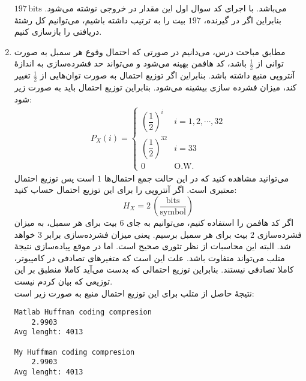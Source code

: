 \documentclass[a4paper]{article}
\begin{document}
\begin{enumerate}[1)]
$197 \, \mathrm{bits}$
می‌باشد. با اجرای کد سوال اول این مقدار در خروجی نوشته می‌شود. بنابراین اگر در گیرنده، 
$197$
بیت را به ترتیب داشته باشیم، می‌توانیم کل رشتۀ دریافتی را بازسازی کنیم.
\item مطابق مباحث درس، می‌دانیم در صورتی که احتمال وقوع هر سمبل به صورت توانی از 
$\frac{1}{2}$
باشد، کد هافمن بهینه می‌شود و می‌تواند حد فشرده‌سازی به اندازۀ آنتروپی منبع داشته باشد. بنابراین اگر توزیع احتمال به صورت توان‌هایی از 
$\frac{1}{2}$
تغییر کند، میزان فشرده سازی بیشینه می‌شود. بنابراین توزیع احتمال باید به صورت زیر شود:
\begin{align*}
P_X(i) = 
\begin{cases}
(\dfrac{1}{2})^i & i = 1, 2, \cdots, 32 \\[10pt]
(\dfrac{1}{2})^{32} & i = 33 \\[10pt]
0 & \mathrm{O.W.}
\end{cases}
\end{align*}
می‌توانید مشاهده کنید که در این حالت جمع احتمال‌ها 
$1$
است پس توزیع احتمال معتبری است. اگر آنتروپی را برای این توزیع احتمال حساب کنید:
$$
H_X = 2 \, (\mathrm{\frac{bits}{symbol}})
$$
اگر کد هافمن را استفاده کنیم، می‌توانیم به جای 
$6$
بیت برای هر سمبل، به میزان فشرده‌سازی 
$2$
بیت برای هر سمبل برسیم. یعنی میزان فشرده‌سازی برابر
$3$
خواهد شد. البته این محاسبات از نظر تئوری صحیح است. اما در موقع پیاده‌سازی نتیجۀ متلب می‌تواند متفاوت باشد. علت این است که متغیر‌های تصادفی در کامپیوتر، کاملا تصادفی نیستند. بنابراین توزیع احتمالی که بدست می‌آید کاملا منطبق بر این توزیعی که بیان کردم نیست. \\
نتیجۀ حاصل از متلب برای این توزیع احتمال منبع به صورت زیر است:
\begin{latin}
\begin{Verbatim}[frame=single,
				baselinestretch=1.2,
				xleftmargin=1.5cm,
				xrightmargin=1.5cm,
				breaklines=true]
Matlab Huffman coding compresion
    2.9903
Avg lenght: 4013

My Huffman coding compresion
    2.9903
Avg lenght: 4013


\end{Verbatim}
\end{latin}
\end{enumerate}
\end{document}
